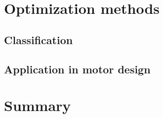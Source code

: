 \section{Optimization methods}                      \label{Chapter:background/optimization methods}
    \subsection{Classification}                     \label{Chapter:background/optimization methods/classification}
    \subsection{Application in motor design}        \label{Chapter:background/optimization methods/application in motor design}


\section{Summary}                                   \label{Chapter:background/summary}